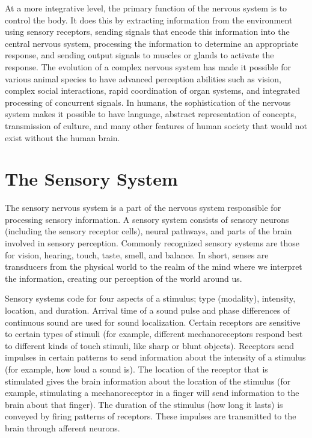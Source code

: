 At a more integrative level, the primary function of the nervous system is to control the body. It does this by extracting information from the environment using sensory receptors, sending signals that encode this information into the central nervous system, processing the information to determine an appropriate response, and sending output signals to muscles or glands to activate the response. The evolution of a complex nervous system has made it possible for various animal species to have advanced perception abilities such as vision, complex social interactions, rapid coordination of organ systems, and integrated processing of concurrent signals. In humans, the sophistication of the nervous system makes it possible to have language, abstract representation of concepts, transmission of culture, and many other features of human society that would not exist without the human brain.

\hypertarget{the-sensory-system}{%
\section{The Sensory System}\label{the-sensory-system}}

The sensory nervous system is a part of the nervous system responsible for processing sensory information. A sensory system consists of sensory neurons (including the sensory receptor cells), neural pathways, and parts of the brain involved in sensory perception. Commonly recognized sensory systems are those for vision, hearing, touch, taste, smell, and balance. In short, senses are transducers from the physical world to the realm of the mind where we interpret the information, creating our perception of the world around us.

Sensory systems code for four aspects of a stimulus; type (modality), intensity, location, and duration. Arrival time of a sound pulse and phase differences of continuous sound are used for sound localization. Certain receptors are sensitive to certain types of stimuli (for example, different mechanoreceptors respond best to different kinds of touch stimuli, like sharp or blunt objects). Receptors send impulses in certain patterns to send information about the intensity of a stimulus (for example, how loud a sound is). The location of the receptor that is stimulated gives the brain information about the location of the stimulus (for example, stimulating a mechanoreceptor in a finger will send information to the brain about that finger). The duration of the stimulus (how long it lasts) is conveyed by firing patterns of receptors. These impulses are transmitted to the brain through afferent neurons.

